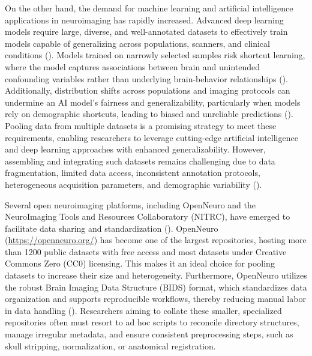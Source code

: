 On the other hand, the demand for machine learning and artificial intelligence applications in neuroimaging has rapidly increased. 
Advanced deep learning models require large, diverse, and well-annotated datasets to effectively train models capable of generalizing across populations, 
scanners, and clinical conditions (\cite{dishner2024survey}). 
Models trained on narrowly selected samples risk shortcut learning, 
where the model captures associations between brain and unintended confounding 
variables rather than underlying brain-behavior relationships (\cite{marek2024replicability, yang2024limits}). 
Additionally, distribution shifts across populations and imaging protocols can undermine an AI model's 
fairness and generalizability, particularly when models rely on demographic shortcuts, 
leading to biased and unreliable predictions (\cite{yang2024limits}). 
Pooling data from multiple datasets is a promising strategy to meet these requirements, 
enabling researchers to leverage cutting-edge artificial intelligence and deep learning approaches with enhanced generalizability.
However, assembling and integrating such datasets remains challenging due to data fragmentation, 
limited data access, inconsistent annotation protocols, heterogeneous acquisition parameters, 
and demographic variability (\cite{goldfarb2022ai, pomponio2019harmonization}).

Several open neuroimaging platforms, including OpenNeuro and the NeuroImaging Tools and Resources Collaboratory (NITRC),
have emerged to facilitate data sharing and standardization (\cite{markiewicz2021openneuro, buccigrossi2008neuroimaging}).
OpenNeuro (\url{https://openneuro.org/}) has become one of the largest repositories, hosting more than 1200 public 
datasets with free access and most datasets under Creative Commons Zero (CC0) licensing. This makes it an ideal choice for 
pooling datasets to increase their size and heterogeneity. 
Furthermore, OpenNeuro utilizes the robust Brain Imaging Data Structure (BIDS) format, which standardizes data 
organization and supports reproducible workflows, thereby reducing manual labor in data handling (\cite{markiewicz2021openneuro}). 
Researchers aiming to collate these smaller, specialized repositories often must 
resort to ad hoc scripts to reconcile directory structures, manage irregular metadata, and ensure consistent preprocessing 
steps, such as skull stripping, normalization, or anatomical registration.

